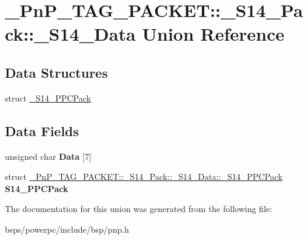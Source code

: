 \hypertarget{union__PnP__TAG__PACKET_1_1__S14__Pack_1_1__S14__Data}{}\section{\+\_\+\+Pn\+P\+\_\+\+T\+A\+G\+\_\+\+P\+A\+C\+K\+ET\+::\+\_\+\+S14\+\_\+\+Pack\+::\+\_\+\+S14\+\_\+\+Data Union Reference}
\label{union__PnP__TAG__PACKET_1_1__S14__Pack_1_1__S14__Data}
\subsection*{Data Structures}
\begin{DoxyCompactItemize}
\item 
struct \mbox{\hyperlink{struct__PnP__TAG__PACKET_1_1__S14__Pack_1_1__S14__Data_1_1__S14__PPCPack}{\+\_\+\+S14\+\_\+\+P\+P\+C\+Pack}}
\end{DoxyCompactItemize}
\subsection*{Data Fields}
\begin{DoxyCompactItemize}
\item 
\mbox{\label{union__PnP__TAG__PACKET_1_1__S14__Pack_1_1__S14__Data_a2fd770049b9aa80a13da4a4153612b3f}} 
unsigned char {\bfseries Data} \mbox{[}7\mbox{]}
\item 
\mbox{\label{union__PnP__TAG__PACKET_1_1__S14__Pack_1_1__S14__Data_a08ee540bef45f5be1a386fb1ec6802ec}} 
struct \mbox{\hyperlink{struct__PnP__TAG__PACKET_1_1__S14__Pack_1_1__S14__Data_1_1__S14__PPCPack}{\+\_\+\+Pn\+P\+\_\+\+T\+A\+G\+\_\+\+P\+A\+C\+K\+E\+T\+::\+\_\+\+S14\+\_\+\+Pack\+::\+\_\+\+S14\+\_\+\+Data\+::\+\_\+\+S14\+\_\+\+P\+P\+C\+Pack}} {\bfseries S14\+\_\+\+P\+P\+C\+Pack}
\end{DoxyCompactItemize}


The documentation for this union was generated from the following file\+:\begin{DoxyCompactItemize}
\item 
bsps/powerpc/include/bsp/pnp.\+h\end{DoxyCompactItemize}
